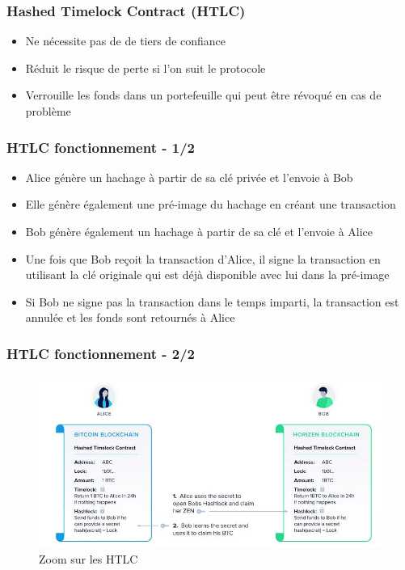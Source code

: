 
\begin{frame}
  \frametitle{Hashed Timelock Contract (HTLC)}
\begin{itemize}
  \item Ne nécessite pas de de tiers de confiance
  \item Réduit le risque de perte si l'on suit le protocole
  \item Verrouille les fonds dans un portefeuille qui peut être révoqué en cas de problème
\end{itemize}
\end{frame}

\begin{frame}
  \frametitle{HTLC fonctionnement - 1/2}
  \begin{itemize}
    \item Alice génère un hachage à partir de sa clé privée et l’envoie à Bob
    \item Elle génère également une pré-image du hachage en créant une transaction
    \item Bob génère également un hachage à partir de sa clé et l’envoie à Alice
    \item Une fois que Bob reçoit la transaction d’Alice, il signe la transaction en utilisant la clé originale qui est déjà disponible avec lui dans la pré-image
    \item Si Bob ne signe pas la transaction dans le temps imparti, la transaction est annulée et les fonds sont retournés à Alice
  \end{itemize}
\end{frame}

\begin{frame}
  \frametitle{HTLC fonctionnement - 2/2}
  \begin{figure}
    \includegraphics[scale = 0.4]{decentralisation/aliceBob.jpg}
    \caption[short]{Zoom sur les HTLC}
  \end{figure}
  
\end{frame}

